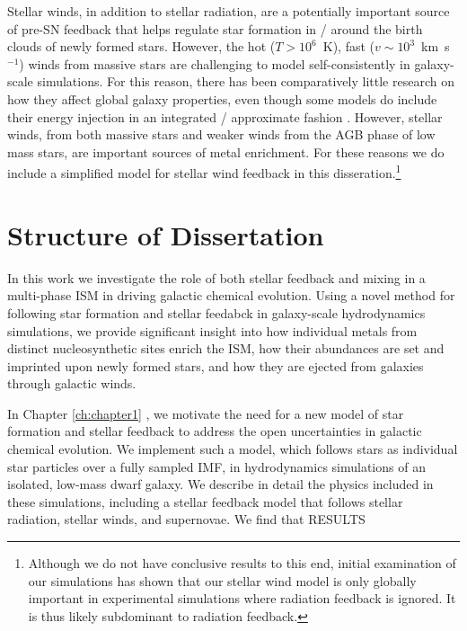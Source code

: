 Stellar winds, in addition to stellar radiation, are a potentially important source of pre-SN feedback that helps regulate star formation in / around the birth clouds of newly formed stars. However, the hot ($T>10^{6}$~K), fast ($v \sim 10^{3}$~km~s$^{-1}$) winds from massive stars \citep{Weaver1977} are challenging to model self-consistently in galaxy-scale simulations. For this reason, there has been comparatively little research on how they affect global galaxy properties, even though some models do include their energy injection in an integrated / approximate fashion \citep[e.g.][]{FIRE}. However, stellar winds, from both massive stars and weaker winds from the AGB phase of low mass stars, are important sources of metal enrichment. For these reasons we do include a simplified model for stellar wind feedback in this disseration.\footnote{Although we do not have conclusive results to this end, initial examination of our simulations has shown that our stellar wind model is only globally important in experimental simulations where radiation feedback is ignored. It is thus likely subdominant to radiation feedback.}
%
%
%
%
%
%


\section{Structure of Dissertation}\label{intro:sec:structure}

In this work we investigate the role of both stellar feedback and mixing in a multi-phase ISM in driving galactic chemical evolution. Using a novel method for following star formation and stellar feedabck in galaxy-scale hydrodynamics simulations, we provide significant insight into how individual metals from distinct nucleosynthetic sites enrich the ISM, how their abundances are set and imprinted upon newly formed stars, and how they are ejected from galaxies through galactic winds. 

In Chapter \ref{ch:chapter1} \citep[published as ][]{Emerick2019}, we motivate the need for a new model of star formation and stellar feedback to address the open uncertainties in galactic chemical evolution. We implement such a model, which follows stars as individual star particles over a fully sampled IMF, in hydrodynamics simulations of an isolated, low-mass dwarf galaxy. We describe in detail the physics included in these simulations, including a stellar feedback model that follows stellar radiation, stellar winds, and supernovae. We find that RESULTS

